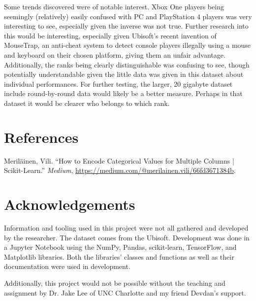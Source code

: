 \documentclass[12pt]{article}
\begin{document}
Some trends discovered were of notable interest.
Xbox One players being seemingly (relatively) easily confused with PC and PlayStation 4 players was very interesting to see, especially given the inverse was not true.
Further research into this would be interesting, especially given Ubisoft's recent invention of MouseTrap, an anti-cheat system to detect console players illegally using a mouse and keyboard on their chosen platform, giving them an unfair advantage.
Additionally, the ranks being clearly distinguishable was confusing to see, though potentially understandable given the little data was given in this dataset about individual performances.
For further testing, the larger, 20 gigabyte dataset include round-by-round data would likely be a better measure.
Perhaps in that dataset it would be clearer who belongs to which rank.

\newpage


\section{References}
Meriläinen, Vili. ``How to Encode Categorical Values for Multiple Columns | Scikit-Learn.'' \emph{Medium}, \url{https://medium.com/@merilainen.vili/66fd3671384b}.

\newpage


\section{Acknowledgements}
Information and tooling used in this project were not all gathered and developed by the researcher.
The dataset comes from the Ubisoft.
Development was done in a Jupyter Notebook using the NumPy, Pandas, scikit-learn, TensorFlow, and Matplotlib libraries.
Both the libraries' classes and functions as well as their documentation were used in development.

Additionally, this project would not be possible without the teaching and assignment by Dr. Jake Lee of UNC Charlotte and my friend Devdan's support.

\newpage
\end{document}
